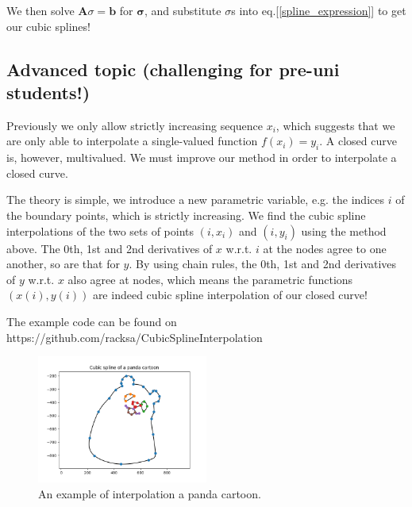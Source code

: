 \documentclass[paper=a4,fontsize=11pt]{scrartcl} %
\begin{document}
We then solve $\mathbf{A}{\sigma}= \mathbf{b}$ for $\mathbf{\sigma}$, and substitute $\sigma$s into eq.[\ref{spline_expression}] to get our cubic splines! 

\subsection*{Advanced topic (challenging for pre-uni students!)}
Previously we only allow strictly increasing sequence $x_i$, which suggests that we are only able to interpolate a single-valued function $f(x_i)=y_i$. A closed curve is, however, multivalued. We must improve our method in order to interpolate a closed curve.

The theory is simple, we introduce a new parametric variable, e.g. the indices $i$ of the boundary points, which is strictly increasing. We find the cubic spline interpolations of the two sets of points $(i, x_i)$ and $(i, y_i)$ using the method above. The 0th, 1st and 2nd derivatives of $x$ w.r.t. $i$ at the nodes agree to one another, so are that for $y$. By using chain rules, the 0th, 1st and 2nd derivatives of $y$ w.r.t. $x$ also agree at nodes, which means the parametric functions $(x(i),y(i))$ are indeed cubic spline interpolation of our closed curve!

The example code can be found on https://github.com/racksa/CubicSplineInterpolation

\begin{figure}[h!]
  \centering
  \includegraphics[width=0.5\textwidth]{image/interpolating_a_panda.png}
  \caption{An example of interpolation a panda cartoon.}
  \label{fig:random_interpolation}
\end{figure}


\end{document}
